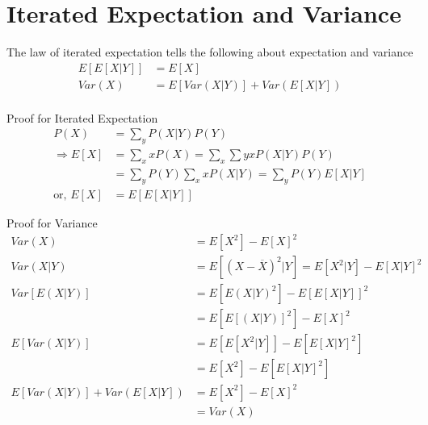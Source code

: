 \documentclass[11pt, a4paper]{article}
\begin{document}
    \section{Iterated Expectation and Variance}
    The law of iterated expectation tells the following about expectation and variance
    \begin{align*}
        E[E[X|Y]] &= E[X] \\
        Var(X) &= E[Var(X|Y)] + Var(E[X|Y])\\
    \end{align*}

    Proof for Iterated Expectation
    \begin{align*}
        P(X) &= \sum_{y} P(X|Y) P(Y) \\
        \Rightarrow E[X] &= \sum_{x} xP(X) = \sum_{x} \sum{y} xP(X|Y)P(Y) \\
            &= \sum_{y} P(Y) \sum_{x} xP(X|Y) = \sum_{y} P(Y) E[X|Y] \\
        \text{or, } E[X] &= E[E[X|Y]] \tag*{$E[X|Y]$ is a function of $X$ and not $Y$}
    \end{align*}
    
    Proof for Variance
    \begin{align*}
        Var(X) &= E[X^{2}] - E[X]^{2} \\
        Var(X|Y) &= E[(X-\overline{X})^{2}|Y] = E[X^{2}|Y] - E[X|Y]^{2} \tag*{1}\\
        Var[E(X|Y)] &= E[E(X|Y)^{2}] - E[E[X|Y]]^{2}\\
                    &= E[E[(X|Y)]^{2}] - E[X]^{2} \tag*{2}\\
        E[Var(X|Y)] &= E[E[X^{2}|Y]] - E[E[X|Y]^{2}] \tag*{from 1}\\
                    &= E[X^{2}] - E[E[X|Y]^{2}] \tag*{3}\\
        E[Var(X|Y)] + Var(E[X|Y]) &= E[X^{2}] - E[X]^{2} \tag*{adding 2 and 3}\\
                                    &= Var(X)
    \end{align*}

\end{document}
